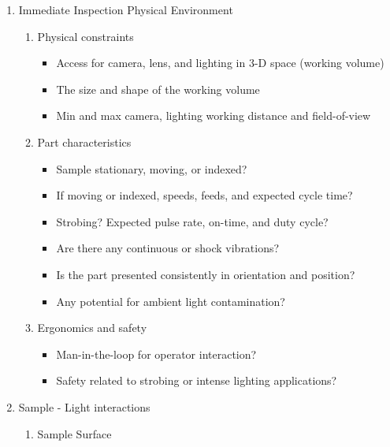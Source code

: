 \begin{enumerate}
    \item Immediate Inspection Physical Environment
          \begin{enumerate}
              \item Physical constraints
                    \begin{itemize}
                        \item Access for camera, lens, and lighting in 3-D space (working volume)
                        \item The size and shape of the working volume
                        \item Min and max camera, lighting working distance and field-of-view
                    \end{itemize}
              \item Part characteristics
                    \begin{itemize}
                        \item Sample stationary, moving, or indexed?
                        \item If moving or indexed, speeds, feeds, and expected cycle time?
                        \item Strobing? Expected pulse rate, on-time, and duty cycle?
                        \item Are there any continuous or shock vibrations?
                        \item Is the part presented consistently in orientation and position?
                        \item Any potential for ambient light contamination?
                    \end{itemize}
              \item Ergonomics and safety
                    \begin{itemize}
                        \item Man-in-the-loop for operator interaction?
                        \item Safety related to strobing or intense lighting applications?
                    \end{itemize}
          \end{enumerate}
    \item Sample - Light interactions
          \begin{enumerate}
              \item Sample Surface
                    \begin{itemize}

\end{itemize}
\end{enumerate}
\end{enumerate}
